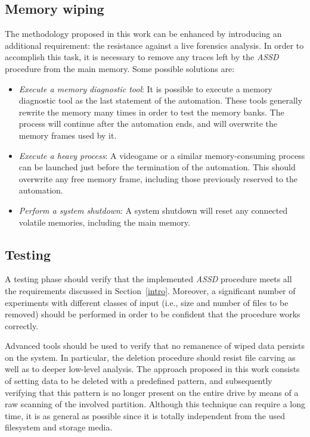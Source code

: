\documentclass[10pt, conference, compsocconf]{IEEEtran}
\newcommand{\assd}{\emph{ASSD}\xspace}
\begin{document}

\subsection{Memory wiping}
The methodology proposed in this work can be enhanced by introducing an additional requirement: the resistance against a live forensics analysis. In order to accomplish this task, it is necessary to remove any traces left by the \assd procedure from the main memory. Some possible solutions are:

\begin{itemize}
 \item \textit{Execute a memory diagnostic tool}: It is possible to execute a memory diagnostic tool as the last statement of the automation. These tools generally rewrite the memory many times in order to test the memory banks. The process will continue after the automation ends, and will overwrite the memory frames used by it.
 \item \textit{Execute a heavy process}: A videogame or a similar memory-consuming process can be launched just before the termination of the automation. This should overwrite any free memory frame, including those previously reserved to the automation.
 \item \textit{Perform a system shutdown}: A system shutdown will reset any connected volatile memories, including the main memory.
\end{itemize}


\subsection{Testing}
A testing phase should verify that the implemented \assd procedure meets all the requirements discussed in Section~\ref{intro}. Moreover, a significant number of experiments with different classes of input (i.e., size and number of files to be removed) should be performed in order to be confident that the procedure works correctly.

Advanced tools should be used to verify that no remanence of wiped data persists on the system. In particular, the deletion procedure should resist file carving as well as to deeper low-level analysis. The approach proposed in this work consists of setting data to be deleted with a predefined pattern, and subsequently verifying that this pattern is no longer present on the entire drive by means of a raw scanning of the involved partition. Although this technique can require a long time, it is as general as possible since it is totally independent from the used filesystem and storage media.
\end{document}
